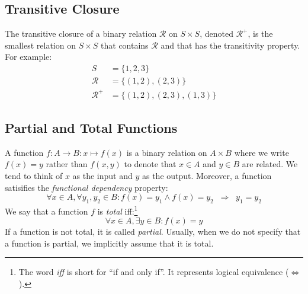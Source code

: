 \subsection*{Transitive Closure}

The transitive closure of a binary relation $\mathcal{R}$ on $S \times S$,
denoted $\mathcal{R}^+$, is
the smallest relation on $S \times S$ that contains $\mathcal{R}$ and that 
has the transitivity property. For example:
\begin{equation*}
\begin{aligned}
S &= \{1, 2, 3\} \\
\mathcal{R} &= \{(1, 2), (2, 3)\} \\
\mathcal{R}^+ &= \{(1, 2), (2, 3), (1, 3)\}
\end{aligned}
\end{equation*}

\subsection*{Partial and Total Functions}

A function $f: A \to B : x \mapsto f(x)$ is a binary relation on $A \times B$ where
we write $f(x) = y$ rather than $f(x,y)$ to denote that $x \in A$ and $y \in B$
are related. We tend to think of $x$ as the input and $y$ as the output. Moreover, a function satisifies the \emph{functional dependency}
property:
\[ \forall x \in A, \forall y_1, y_2 \in B: f(x) = y_1 \wedge f(x) = y_2 \;\;\Rightarrow\;\; y_1 = y_2 \]
We say that a function $f$ is \emph{total} iff:\footnote{The word \emph{iff} is short for ``if and only if''. It represents logical equivalence ($\Leftrightarrow$).}
\[ \forall x \in A, \exists y \in B: f(x) = y \]
If a function is not total, it is called \emph{partial}. Usually, when we do
not specify that a function is partial, we implicitly assume that it is total.


